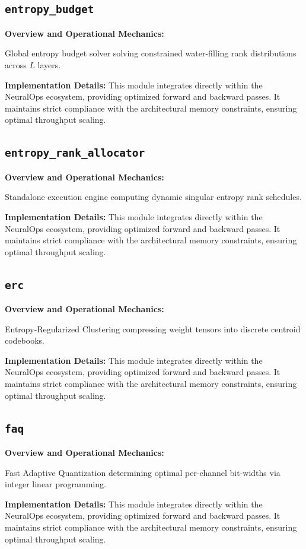 \subsection{\texttt{entropy\_budget}}
\textbf{Overview and Operational Mechanics:}

Global entropy budget solver solving constrained water-filling rank distributions across $L$ layers.

\textbf{Implementation Details:}
This module integrates directly within the NeuralOps ecosystem, providing optimized forward and backward passes. It maintains strict compliance with the architectural memory constraints, ensuring optimal throughput scaling.

\subsection{\texttt{entropy\_rank\_allocator}}
\textbf{Overview and Operational Mechanics:}

Standalone execution engine computing dynamic singular entropy rank schedules.

\textbf{Implementation Details:}
This module integrates directly within the NeuralOps ecosystem, providing optimized forward and backward passes. It maintains strict compliance with the architectural memory constraints, ensuring optimal throughput scaling.

\subsection{\texttt{erc}}
\textbf{Overview and Operational Mechanics:}

Entropy-Regularized Clustering compressing weight tensors into discrete centroid codebooks.

\textbf{Implementation Details:}
This module integrates directly within the NeuralOps ecosystem, providing optimized forward and backward passes. It maintains strict compliance with the architectural memory constraints, ensuring optimal throughput scaling.

\subsection{\texttt{faq}}
\textbf{Overview and Operational Mechanics:}

Fast Adaptive Quantization determining optimal per-channel bit-widths via integer linear programming.

\textbf{Implementation Details:}
This module integrates directly within the NeuralOps ecosystem, providing optimized forward and backward passes. It maintains strict compliance with the architectural memory constraints, ensuring optimal throughput scaling.

